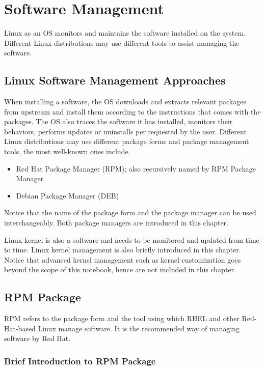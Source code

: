 \chapter{Software Management}

Linux as an OS monitors and maintains the software installed on the system. Different Linux distributions may use different tools to assist managing the software.

\section{Linux Software Management Approaches}

When installing a software, the OS downloads and extracts relevant packages from upstream and install them according to the instructions that comes with the packages. The OS also traces the software it has installed, monitors their behaviors, performs updates or uninstalls per requested by the user. Different Linux distributions may use different package forms and package management tools, the most well-known ones include
\begin{itemize}
	\item Red Hat Package Manager (RPM); also recursively named by RPM Package Manager
	\item Debian Package Manager (DEB)
\end{itemize}
Notice that the name of the package form and the package manager can be used interchangeably. Both package managers are introduced in this chapter.

Linux kernel is also a software and needs to be monitored and updated from time to time. Linux kernel management is also briefly introduced in this chapter. Notice that advanced kernel management such as kernel customization goes beyond the scope of this notebook, hence are not included in this chapter.

\section{RPM Package}

RPM refers to the package form and the tool using which RHEL and other Red-Hat-based Linux manage software. It is the recommended way of managing software by Red Hat.

\subsection{Brief Introduction to RPM Package}

